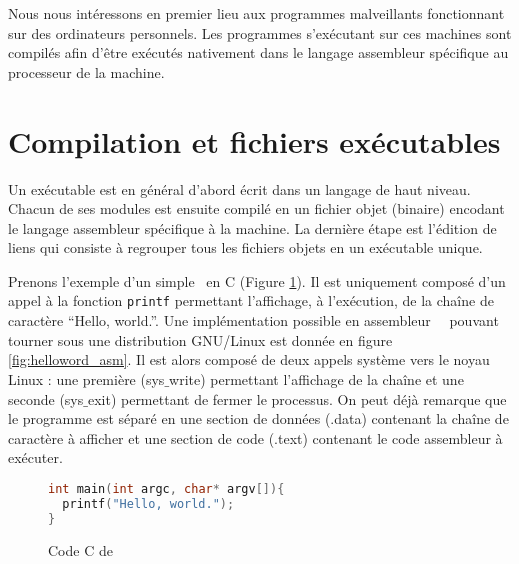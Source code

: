 
Nous nous intéressons en premier lieu aux programmes malveillants fonctionnant sur des ordinateurs personnels.
Les programmes s'exécutant sur ces machines sont compilés afin d'être exécutés nativement dans le langage assembleur spécifique au processeur de la machine.

\section{Compilation et fichiers exécutables}
Un exécutable est en général d'abord écrit dans un langage de haut niveau. Chacun de ses modules est ensuite compilé en un fichier objet (binaire) encodant le langage assembleur spécifique à la machine. La dernière étape est l'édition de liens qui consiste à regrouper tous les fichiers objets en un exécutable unique.

Prenons l'exemple d'un simple \helloworld\ en C (Figure \ref{fig:helloword_c}). Il est uniquement composé d'un appel à la fonction \texttt{printf} permettant l'affichage, à l'exécution, de la chaîne de caractère ``Hello, world.''.
Une implémentation possible en assembleur \nasm\ \xq\ pouvant tourner sous une distribution GNU/Linux est donnée en figure \ref{fig:helloword_asm}. Il est alors composé de deux appels système vers le noyau Linux : une première (sys$\_$write) permettant l'affichage de la chaîne et une seconde (sys$\_$exit) permettant de fermer le processus.
On peut déjà remarque que le programme est séparé en une section de données (.data) contenant la chaîne de caractère à afficher et une section de code (.text) contenant le code assembleur à exécuter.
\begin{figure}
\begin{lstlisting}[language={C}]
int main(int argc, char* argv[]){
  printf("Hello, world.");
}
\end{lstlisting}
\caption{Code C de \helloworld}
\label{fig:helloword_c}
\end{figure}


